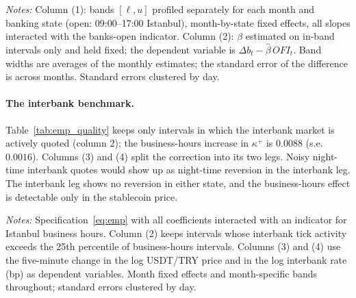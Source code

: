 \documentclass[12pt]{article}
\theoremstyle{definition}
\theoremstyle{remark}
\begin{document}
\begin{table}[t]
\centering
\caption{\textbf{Separating the friction from effective capacity}}
\label{tab:emp_state}
\footnotesize
\resizebox{\ifdim\width>\textwidth\textwidth\else\width\fi}{!}{}
\begin{minipage}{0.95\textwidth}
\footnotesize\vspace{4pt}
\emph{Notes:} Column (1): bands $[\ell,u]$ profiled separately for each month and banking state (open: 09:00--17:00 Istanbul), month-by-state fixed effects, all slopes interacted with the banks-open indicator. Column (2): $\beta$ estimated on in-band intervals only and held fixed; the dependent variable is $\Delta b_t-\hat\beta\,\mathit{OFI}_t$. Band widths are averages of the monthly estimates; the standard error of the difference is across months. Standard errors clustered by day.
\end{minipage}
\end{table}


\paragraph{The interbank benchmark.} Table~\ref{tab:emp_quality} keeps only intervals in which the interbank market is actively quoted (column 2); the business-hours increase in $\kappa^+$ is $0.0088$ (s.e.\ $0.0016$). Columns (3) and (4) split the correction into its two legs. Noisy night-time interbank quotes would show up as night-time reversion in the interbank leg. The interbank leg shows no reversion in either state, and the business-hours effect is detectable only in the stablecoin price.

\begin{table}[t]
\centering
\caption{\textbf{Banking hours and the interbank benchmark}}
\label{tab:emp_quality}
\footnotesize
\resizebox{\ifdim\width>\textwidth\textwidth\else\width\fi}{!}{}
\begin{minipage}{0.95\textwidth}
\footnotesize\vspace{4pt}
\emph{Notes:} Specification~\eqref{eq:emp} with all coefficients interacted with an indicator for Istanbul business hours. Column (2) keeps intervals whose interbank tick activity exceeds the 25th percentile of business-hours intervals. Columns (3) and (4) use the five-minute change in the log USDT/TRY price and in the log interbank rate (bp) as dependent variables. Month fixed effects and month-specific bands throughout; standard errors clustered by day.
\end{minipage}
\end{table}
\end{document}
